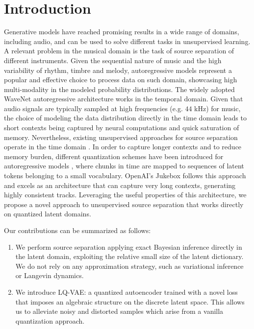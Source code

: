 \documentclass[a4paper]{article}
\begin{document}
\section{Introduction}
\label{sec:introduction}
Generative models have reached promising results in a wide range of domains, including audio, and can be used to solve different tasks in unsupervised learning. A relevant problem in the musical domain is the task of source separation of different instruments. Given the sequential nature of music and the high variability of rhythm,  timbre and melody, autoregressive models \cite{larochelle11} represent a popular and effective choice  to process data on such domain, showcasing high multi-modality in the modeled probability distributions. The widely adopted WaveNet autoregressive architecture \cite{oord2016} works in the temporal domain. Given that audio signals are typically sampled at high frequencies (e.g. $44$ kHz) for music, the choice of modeling the data distribution directly in the time domain leads to short contexts being captured by neural computations and quick saturation of memory. Nevertheless, existing unsupervised approaches for source separation operate in the time domain \cite{jayaram2021}. In order to capture longer contexts and to reduce memory burden, different quantization schemes have been introduced for autoregressive models \cite{oord2017,razavi2019}, where chunks in time are mapped to sequences of latent tokens belonging to a small vocabulary. OpenAI's Jukebox \cite{dhariwal:2020} follows this approach and excels as an architecture that can capture very long contexts, generating highly consistent tracks.
Leveraging the useful properties of this architecture, we propose a novel approach to unsupervised source separation that works directly on quantized latent domains. 

Our contributions can be summarized as follows:
\begin{enumerate}
    \item We perform source separation applying exact Bayesian inference directly in the latent domain, exploiting the relative small size of the latent dictionary. We do not rely on any approximation strategy, such as variational inference or Langevin dynamics. 
    \item We introduce LQ-VAE: a quantized autoencoder trained with a novel loss that  imposes an algebraic structure on the discrete latent space. This allows us to alleviate noisy and distorted samples which arise from a vanilla quantization approach.
 \end{enumerate}
\end{document}
